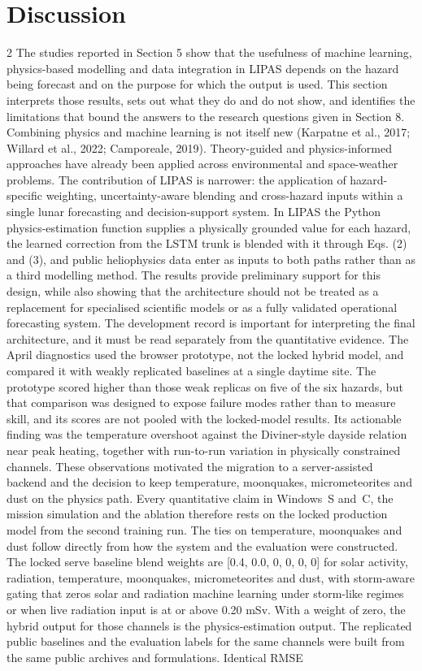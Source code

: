 \section{Discussion}
\begin{multicols}{2}
The studies reported in Section 5 show that the usefulness of machine learning, physics-based modelling and data integration in LIPAS depends on the hazard being forecast and on the purpose for which the output is used. This section interprets those results, sets out what they do and do not show, and identifies the limitations that bound the answers to the research questions given in Section 8. Combining physics and machine learning is not itself new (Karpatne et al., 2017; Willard et al., 2022; Camporeale, 2019). Theory-guided and physics-informed approaches have already been applied across environmental and space-weather problems. The contribution of LIPAS is narrower: the application of hazard-specific weighting, uncertainty-aware blending and cross-hazard inputs within a single lunar forecasting and decision-support system. In LIPAS the Python physics-estimation function supplies a physically grounded value for each hazard, the learned correction from the LSTM trunk is blended with it through Eqs. (2) and (3), and public heliophysics data enter as inputs to both paths rather than as a third modelling method. The results provide preliminary support for this design, while also showing that the architecture should not be treated as a replacement for specialised scientific models or as a fully validated operational forecasting system. The development record is important for interpreting the final architecture, and it must be read separately from the quantitative evidence. The April diagnostics used the browser prototype, not the locked hybrid model, and compared it with weakly replicated baselines at a single daytime site. The prototype scored higher than those weak replicas on five of the six hazards, but that comparison was designed to expose failure modes rather than to measure skill, and its scores are not pooled with the locked-model results. Its actionable finding was the temperature overshoot against the Diviner-style dayside relation near peak heating, together with run-to-run variation in physically constrained channels. These observations motivated the migration to a server-assisted backend and the decision to keep temperature, moonquakes, micrometeorites and dust on the physics path. Every quantitative claim in Windows~S and~C, the mission simulation and the ablation therefore rests on the locked production model from the second training run. The ties on temperature, moonquakes and dust follow directly from how the system and the evaluation were constructed. The locked serve baseline blend weights are [0.4, 0.0, 0, 0, 0, 0] for solar activity, radiation, temperature, moonquakes, micrometeorites and dust, with storm-aware gating that zeros solar and radiation machine learning under storm-like regimes or when live radiation input is at or above 0.20 mSv. With a weight of zero, the hybrid output for those channels is the physics-estimation output. The replicated public baselines and the evaluation labels for the same channels were built from the same public archives and formulations. Identical RMSE 
\end{multicols}
